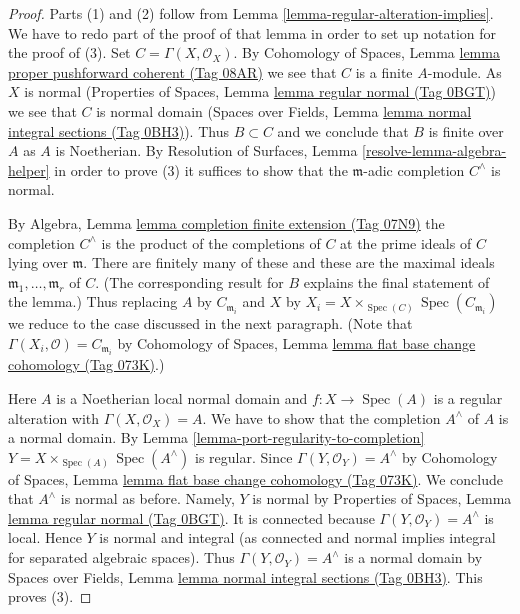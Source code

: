 \documentclass{amsart}
\theoremstyle{plain}
\theoremstyle{definition}
\theoremstyle{remark}
\numberwithin{equation}{subsection}
\def\Spec{\mathop{\mathrm{Spec}}}
\begin{document}
\begin{proof}
Parts (1) and (2) follow from Lemma \ref{lemma-regular-alteration-implies}.
We have to redo part of the proof of that lemma in order to set up notation
for the proof of (3). Set $C = \Gamma(X, \mathcal{O}_X)$. By
Cohomology of Spaces, Lemma
\href{https://stacks.math.columbia.edu/tag/08AR}{lemma proper pushforward coherent (Tag 08AR)}
we see that $C$ is a finite $A$-module.
As $X$ is normal
(Properties of Spaces, Lemma
\href{https://stacks.math.columbia.edu/tag/0BGT}{lemma regular normal (Tag 0BGT)})
we see that $C$ is normal domain
(Spaces over Fields, Lemma
\href{https://stacks.math.columbia.edu/tag/0BH3}{lemma normal integral sections (Tag 0BH3)}).
Thus $B \subset C$ and we conclude that $B$ is finite over $A$
as $A$ is Noetherian. By
Resolution of Surfaces, Lemma \ref{resolve-lemma-algebra-helper}
in order to prove (3) it suffices to show
that the $\mathfrak m$-adic completion $C^\wedge$ is normal.

\medskip\noindent
By Algebra, Lemma \href{https://stacks.math.columbia.edu/tag/07N9}{lemma completion finite extension (Tag 07N9)}
the completion $C^\wedge$ is the product of the completions of
$C$ at the prime ideals of $C$ lying over $\mathfrak m$.
There are finitely many of these and these are the maximal
ideals $\mathfrak m_1, \ldots, \mathfrak m_r$ of $C$.
(The corresponding result for $B$ explains the final statement of the lemma.)
Thus replacing $A$ by $C_{\mathfrak m_i}$ and $X$ by
$X_i = X \times_{\Spec(C)} \Spec(C_{\mathfrak m_i})$
we reduce to the case discussed in the next paragraph.
(Note that $\Gamma(X_i, \mathcal{O}) = C_{\mathfrak m_i}$ by
Cohomology of Spaces,
Lemma \href{https://stacks.math.columbia.edu/tag/073K}{lemma flat base change cohomology (Tag 073K)}.)

\medskip\noindent
Here $A$ is a Noetherian local normal domain and $f : X \to \Spec(A)$
is a regular alteration with $\Gamma(X, \mathcal{O}_X) = A$.
We have to show that the completion $A^\wedge$
of $A$ is a normal domain. By
Lemma \ref{lemma-port-regularity-to-completion}
$Y = X \times_{\Spec(A)} \Spec(A^\wedge)$ is regular.
Since $\Gamma(Y, \mathcal{O}_Y) = A^\wedge$
by Cohomology of Spaces,
Lemma \href{https://stacks.math.columbia.edu/tag/073K}{lemma flat base change cohomology (Tag 073K)}.
We conclude that $A^\wedge$ is normal as before.
Namely, $Y$ is normal by Properties of Spaces, Lemma
\href{https://stacks.math.columbia.edu/tag/0BGT}{lemma regular normal (Tag 0BGT)}.
It is connected because $\Gamma(Y, \mathcal{O}_Y) = A^\wedge$ is local.
Hence $Y$ is normal and integral (as connected and normal
implies integral for separated algebraic spaces). Thus
$\Gamma(Y, \mathcal{O}_Y) = A^\wedge$ is a normal domain by
Spaces over Fields, Lemma
\href{https://stacks.math.columbia.edu/tag/0BH3}{lemma normal integral sections (Tag 0BH3)}.
This proves (3).


\end{proof}
\end{document}
